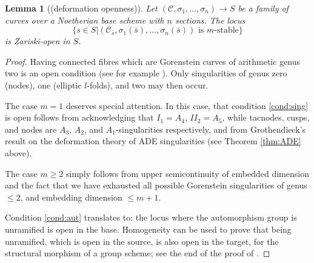 \documentclass{compositio}
\renewcommand{\to}{\rightarrow}
\theoremstyle{plain}
\newtheorem{lem}[thm]{Lemma}
\theoremstyle{definition}
\theoremstyle{remark}
\begin{document}
\begin{lem}[(deformation openness)]\label{lem:defop}
 Let $(\mathcal C,\sigma_1,\ldots,\sigma_n)\to S$ be a family of curves over a Noetherian base scheme with $n$ sections. The locus \[\{s\in S|(\mathcal C_{\bar s},\sigma_1(\bar s),\ldots,\sigma_n(\bar s)) \text{ is } m\text{-stable}\}\] is Zariski-open in $S$.
\end{lem}
\begin{proof}
 Having connected fibres which are Gorenstein curves of arithmetic genus two is an open condition (see for example \cite[\href{https://stacks.math.columbia.edu/tag/0E1M}{Tag 0E1M}]{stacks-project}). Only singularities of genus zero (nodes), one (elliptic $l$-folds), and two may then occur.
 
 The case $m=1$ deserves special attention. In this case, that condition \eqref{cond:sing} is open follows from acknowledging that $I_1=A_4$, $I\!I_2=A_5$, while tacnodes, cusps, and nodes are $A_3$, $A_2$, and $A_1$-singularities respectively, and from Grothendieck's result on the deformation theory of ADE singularities (see Theorem \ref{thm:ADE} above).
 
 The case $m\geq 2$ simply follows from upper semicontinuity of embedded dimension and the fact that we have exhausted all possible Gorenstein singularities of genus $\leq 2$, and embedding dimension $\leq m+1$.
 
 Condition \eqref{cond:aut} translates to: the locus where the automorphism group is unramified is open in the base. Homogeneity can be used to prove that being unramified, which is open in the source, is also open in the target, for the structural morphism of a group scheme; see the end of the proof of \cite[Lemma 3.10]{SMY1}.
 

\end{proof}
\end{document}
